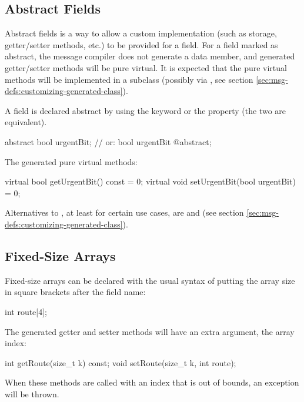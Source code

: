 \subsection{Abstract Fields}
\label{sec:msg-defs:abstract-fields}

Abstract fields is a way to allow a custom implementation (such as storage,
getter/setter methods, etc.) to be provided for a field. For a field marked as
abstract, the message compiler does not generate a data member, and generated
getter/setter methods will be pure virtual. It is expected that the pure virtual
methods will be implemented in a subclass (possibly via , see
section \ref{sec:msg-defs:customizing-generated-class}).

A field is declared abstract by using the  keyword or the
 property (the two are equivalent).

\begin{msg}
abstract bool urgentBit; // or: bool urgentBit @abstract;
\end{msg}

The generated pure virtual methods:

\begin{cpp}
virtual bool getUrgentBit() const = 0;
virtual void setUrgentBit(bool urgentBit) = 0;
\end{cpp}

Alternatives to , at least for certain use cases, are
 and  (see section
\ref{sec:msg-defs:customizing-generated-class}).


\subsection{Fixed-Size Arrays}
\label{sec:msg-defs:fixed-size-arrays}

Fixed-size arrays can be declared with the usual syntax of putting the
array size in square brackets after the field name:

\begin{msg}
int route[4];
\end{msg}

The generated getter and setter methods will have an extra  argument,
the array index:

\begin{cpp}
int getRoute(size_t k) const;
void setRoute(size_t k, int route);
\end{cpp}

When these methods are called with an index that is out of bounds, an exception
will be thrown.

